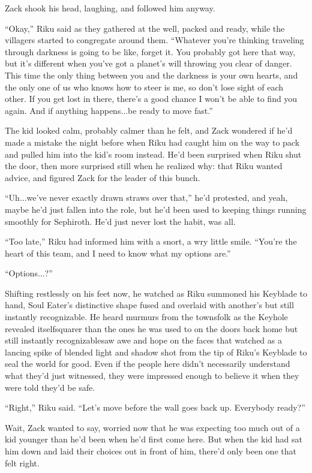 Zack shook his head, laughing, and followed him anyway.


\scenechange


``Okay,'' Riku said as they gathered at the well, packed and ready, while the villagers started to congregate around them. ``Whatever you're thinking traveling through darkness is going to be like, forget it. You probably got here that way, but it's different when you've got a planet's will throwing you clear of danger. This time the only thing between you and the darkness is your own hearts, and the only one of us who knows how to steer is me, so don't lose sight of each other. If you get lost in there, there's a good chance I won't be able to find you again. And if anything happens...be ready to move fast.''

The kid looked calm, probably calmer than he felt, and Zack wondered if he'd made a mistake the night before when Riku had caught him on the way to pack and pulled him into the kid's room instead. He'd been surprised when Riku shut the door, then more surprised still when he realized why: that Riku wanted advice, and figured Zack for the leader of this bunch.

``Uh...we've never exactly drawn straws over that,'' he'd protested, and yeah, maybe he'd just fallen into the role, but he'd been used to keeping things running smoothly for Sephiroth. He'd just never lost the habit, was all.

``Too late,'' Riku had informed him with a snort, a wry little smile. ``You're the heart of this team, and I need to know what my options are.''

``Options...?''

Shifting restlessly on his feet now, he watched as Riku summoned his Keyblade to hand, Soul Eater's distinctive shape fused and overlaid with another's but still instantly recognizable. He heard murmurs from the townsfolk as the Keyhole revealed itself\textemdash squarer than the ones he was used to on the doors back home but still instantly recognizable\textemdash saw awe and hope on the faces that watched as a lancing spike of blended light and shadow shot from the tip of Riku's Keyblade to seal the world for good. Even if the people here didn't necessarily understand what they'd just witnessed, they were impressed enough to believe it when they were told they'd be safe.

``Right,'' Riku said. ``Let's move before the wall goes back up. Everybody ready?''

Wait, Zack wanted to say, worried now that he was expecting too much out of a kid younger than he'd been when he'd first come here. But when the kid had sat him down and laid their choices out in front of him, there'd only been one that felt right.

